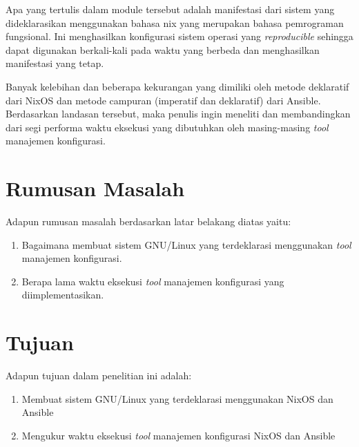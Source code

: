 \documentclass[10pt,]{report}
\begin{document}
\begin{adjustwidth}{0.70cm}{}
	Apa yang tertulis dalam module tersebut adalah manifestasi dari sistem yang
	dideklarasikan menggunakan bahasa nix yang merupakan bahasa pemrograman
	fungsional. Ini menghasilkan konfigurasi sistem operasi yang \textit{reproducible}
	sehingga dapat digunakan berkali-kali pada waktu yang berbeda dan
	menghasilkan manifestasi yang tetap.

	Banyak kelebihan dan beberapa kekurangan yang dimiliki oleh metode deklaratif
	dari NixOS dan metode campuran (imperatif dan deklaratif) dari Ansible.
	Berdasarkan landasan tersebut, maka penulis ingin meneliti dan membandingkan
	dari segi performa waktu eksekusi yang dibutuhkan oleh masing-masing \textit{tool} manajemen
	konfigurasi.
\end{adjustwidth}
\vspace{3mm}
\section{Rumusan Masalah}
\vspace{-3mm}
\begin{adjustwidth}{0.70cm}{}
	Adapun rumusan masalah berdasarkan latar belakang diatas yaitu:
	\begin{enumerate}[leftmargin=0.45cm]
		\item Bagaimana membuat sistem GNU/Linux yang terdeklarasi menggunakan \textit{tool}
		      manajemen konfigurasi.
		\item Berapa lama waktu eksekusi \textit{tool} manajemen konfigurasi yang diimplementasikan.
	\end{enumerate}
\end{adjustwidth}
\section{Tujuan}
\vspace{-3mm}
\begin{adjustwidth}{0.70cm}{}
	Adapun tujuan dalam penelitian ini adalah:
	\begin{enumerate}[leftmargin=0.45cm]
		\item Membuat sistem GNU/Linux yang terdeklarasi menggunakan NixOS dan
		      Ansible
		\item Mengukur waktu eksekusi \textit{tool} manajemen konfigurasi NixOS dan Ansible
	\end{enumerate}
\end{adjustwidth}
\vspace{3mm}
\end{document}
